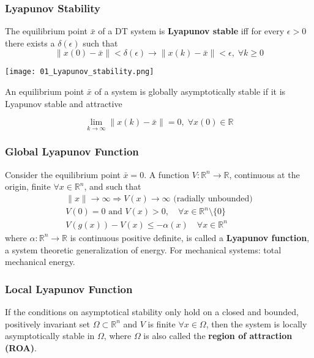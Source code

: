 \subsubsection{Lyapunov Stability}
The equilibrium point $\bar{x}$ of a DT system is \textbf{Lyapunov stable} iff for every $\epsilon >0$ there exists a $\delta(\epsilon)$ such that
\begin{equation*}
    \lVert x(0) - \bar{x} \rVert < \delta(\epsilon) \to \lVert x(k) - \bar{x} \rVert < \epsilon, \; \forall k \geq 0
\end{equation*}

\begin{center}
    \texttt{[image: 01\_Lyapunov\_stability.png]}
\end{center}


An equilibrium point $\bar{x}$ of a system is globally asymptotically stable if it is Lyapunov stable and attractive

\begin{equation*}
    \lim_{k\to\infty} \lVert x(k) - \bar{x} \rVert = 0, \; \forall x(0) \in \mathbb{R}
\end{equation*}


\subsubsection{Global Lyapunov Function}

Consider the equilibrium point $\bar{x}=0$. A function $V:\mathbb{R}^n\to \mathbb{R}$, continuous at the origin, finite $\forall x \in \mathbb{R}^n$, and such that
\begin{gather*}
    \lVert x \rVert \to \infty \Rightarrow V(x) \to \infty \text{ (radially unbounded)}\\
    V(0)=0 \text{ and } V(x)>0, \quad \forall x \in \mathbb{R}^n \setminus\{0\}\\
    V(g(x)) - V(x) \leq -\alpha(x) \quad \forall x \in \mathbb{R}^n
\end{gather*}
where $\alpha:\mathbb{R}^n\to \mathbb{R}$ is continuous positive definite, is called a \textbf{Lyapunov function}, a system theoretic generalization of energy. For mechanical systems: total mechanical energy.
\subsubsection{Local Lyapunov Function}
If the conditions on asymptotical stability only hold on a closed and bounded, positively invariant set $\Omega \subset \mathbb{R}^n$ and $V$ is finite $\forall x \in \Omega$, then the system is locally asymptotically stable in $\Omega$, where $\Omega$ is also called the \textbf{region of attraction (ROA)}.
